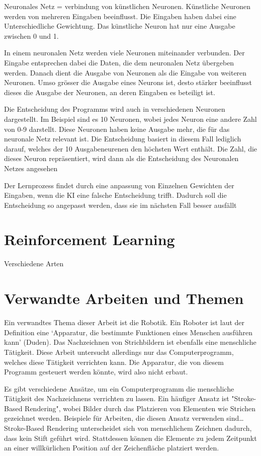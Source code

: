 Neuronales Netz = verbindung von künstlichen Neuronen. Künstliche Neuronen
werden von mehreren Eingaben beeinflusst. Die Eingaben haben dabei eine
Unterschiedliche Gewichtung. Das künstliche Neuron hat nur eine Ausgabe zwischen
0 und 1.

In einem neuronalen Netz werden viele Neuronen miteinander verbunden. Der
Eingabe entsprechen dabei die Daten, die dem neuronalen Netz übergeben werden.
Danach dient die Ausgabe von Neuronen als die Eingabe von weiteren Neuronen.
Umso grösser die Ausgabe eines Neurons ist, desto stärker beeinflusst dieses die
Ausgabe der Neuronen, an deren Eingaben es beteiligt ist.

Die Entscheidung des Programms wird auch in verschiedenen Neuronen dargestellt.
Im Beispiel sind es 10 Neuronen, wobei jedes Neuron eine andere Zahl von 0-9
darstellt. Diese Neuronen haben keine Ausgabe mehr, die für das neuronale Netz
relevant ist. Die Entscheidung basiert in diesem Fall lediglich darauf, welches
der 10 Ausgabeneurenen den höchsten Wert enthält. Die Zahl, die dieses Neuron
repräsentiert, wird dann als die Entscheidung des Neuronalen Netzes angesehen

Der Lernprozess findet durch eine anpassung von Einzelnen Gewichten der
Eingaben, wenn die KI eine falsche Entscheidung trifft. Dadurch soll die
Entscheidung so angepasst werden, dass sie im nächsten Fall besser ausfällt




\section{Reinforcement Learning}
\label{chap:t_rl}
Verschiedene Arten


\section{Verwandte Arbeiten und Themen}
\label{chap:t_verwandt}

Ein verwandtes Thema dieser Arbeit ist die Robotik. Ein Roboter ist laut der
Definition eine `Apparatur, die bestimmte Funktionen eines Menschen ausführen
kann' (Duden). Das Nachzeichnen von Strichbildern ist ebenfalls eine menschliche
Tätigkeit. Diese Arbeit untersucht allerdings nur das Computerprogramm, welches
diese Tätigkeit verrichten kann. Die Apparatur, die von diesem Programm
gesteuert werden könnte, wird also nicht erbaut.

Es gibt verschiedene Ansätze, um ein Computerprogramm die menschliche Tätigkeit
des Nachzeichnens verrichten zu lassen. Ein häufiger Ansatz ist "Stroke-Based
Rendering", wobei Bilder durch das Platzieren von Elementen wie Strichen
gezeichnet werden. Beispiele für Arbeiten, die diesen Ansatz verwenden sind\dots
Stroke-Based Rendering unterscheidet sich von menschlichem Zeichnen dadurch,
dass kein Stift geführt wird. Stattdessen können die Elemente zu jedem Zeitpunkt
an einer willkürlichen Position auf der Zeichenfläche platziert werden.

